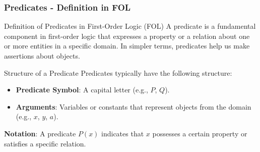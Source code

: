 \documentclass[aspectratio=169]{beamer}
\begin{document}
\begin{frame}[fragile]
    \frametitle{Predicates - Definition in FOL}
    \begin{block}{Definition of Predicates in First-Order Logic (FOL)}
        A predicate is a fundamental component in first-order logic that expresses a property or a relation about one or more entities in a specific domain.
        In simpler terms, predicates help us make assertions about objects.
    \end{block}
    
    \begin{block}{Structure of a Predicate}
        Predicates typically have the following structure:
        \begin{itemize}
            \item \textbf{Predicate Symbol}: A capital letter (e.g., \( P \), \( Q \)).
            \item \textbf{Arguments}: Variables or constants that represent objects from the domain (e.g., \( x \), \( y \), \( a \)).
        \end{itemize}
        \textbf{Notation}: A predicate \( P(x) \) indicates that \( x \) possesses a certain property or satisfies a specific relation.
    \end{block}
\end{frame}
\end{document}
